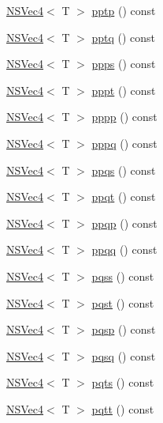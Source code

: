 \begin{DoxyCompactItemize}
\item 
\hyperlink{structNSVec4}{N\-S\-Vec4}$<$ T $>$ \hyperlink{structNSVec4_a997002591721e641e02c690c070d9b57}{pptp} () const 
\item 
\hyperlink{structNSVec4}{N\-S\-Vec4}$<$ T $>$ \hyperlink{structNSVec4_aa8628fb364272887e7ceadc2f4239424}{pptq} () const 
\item 
\hyperlink{structNSVec4}{N\-S\-Vec4}$<$ T $>$ \hyperlink{structNSVec4_aecd0b4b93500ffce2a1f614367582108}{ppps} () const 
\item 
\hyperlink{structNSVec4}{N\-S\-Vec4}$<$ T $>$ \hyperlink{structNSVec4_a6a20276ff1ed3e411f69316a79a3f880}{pppt} () const 
\item 
\hyperlink{structNSVec4}{N\-S\-Vec4}$<$ T $>$ \hyperlink{structNSVec4_ae4edc8e378f29481fc66f970d1993694}{pppp} () const 
\item 
\hyperlink{structNSVec4}{N\-S\-Vec4}$<$ T $>$ \hyperlink{structNSVec4_aa85ba7d4de349630fe691cd239c02156}{pppq} () const 
\item 
\hyperlink{structNSVec4}{N\-S\-Vec4}$<$ T $>$ \hyperlink{structNSVec4_acef91bf2616b2d8d733bd1be41eab9b8}{ppqs} () const 
\item 
\hyperlink{structNSVec4}{N\-S\-Vec4}$<$ T $>$ \hyperlink{structNSVec4_ae37a170e0700f14f9b6b603133d437cd}{ppqt} () const 
\item 
\hyperlink{structNSVec4}{N\-S\-Vec4}$<$ T $>$ \hyperlink{structNSVec4_ae9b4a3de47644c4b50e04a4be201e35f}{ppqp} () const 
\item 
\hyperlink{structNSVec4}{N\-S\-Vec4}$<$ T $>$ \hyperlink{structNSVec4_ab5aa6a035fbf2ccd6eab3759af4861d4}{ppqq} () const 
\item 
\hyperlink{structNSVec4}{N\-S\-Vec4}$<$ T $>$ \hyperlink{structNSVec4_a2787c89ea648faf522161392af18abdb}{pqss} () const 
\item 
\hyperlink{structNSVec4}{N\-S\-Vec4}$<$ T $>$ \hyperlink{structNSVec4_a8e504ca16684a52b59443ecddbae998c}{pqst} () const 
\item 
\hyperlink{structNSVec4}{N\-S\-Vec4}$<$ T $>$ \hyperlink{structNSVec4_a5b7b2d43fad8194854df4af02ee465ee}{pqsp} () const 
\item 
\hyperlink{structNSVec4}{N\-S\-Vec4}$<$ T $>$ \hyperlink{structNSVec4_a2be8d63a91a789a0468f1e110ed4ce97}{pqsq} () const 
\item 
\hyperlink{structNSVec4}{N\-S\-Vec4}$<$ T $>$ \hyperlink{structNSVec4_a191b4b578b75e118ab63e8d113773500}{pqts} () const 
\item 
\hyperlink{structNSVec4}{N\-S\-Vec4}$<$ T $>$ \hyperlink{structNSVec4_a15bad7051f5fc05da6686136f4842131}{pqtt} () const 

\end{DoxyCompactItemize}
